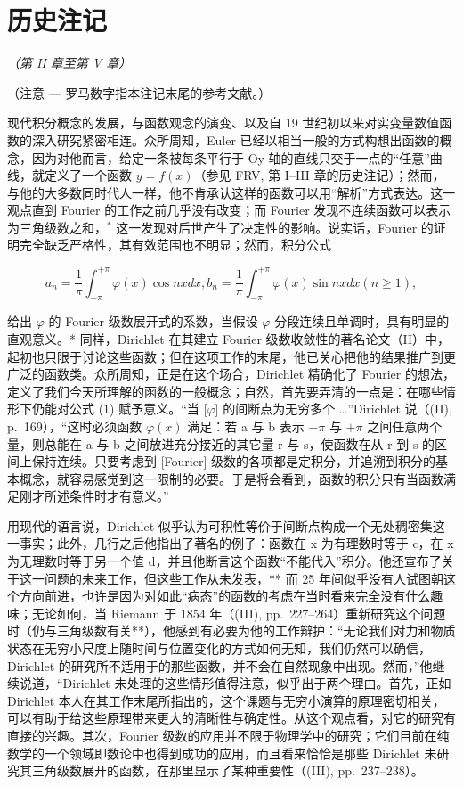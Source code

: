 \chapter*{历史注记}
{}

\begin{center}
\textit{（第 II 章至第 V 章）}
\end{center}

（注意 --- 罗马数字指本注记末尾的参考文献。）

现代积分概念的发展，与函数观念的演变、以及自 19 世纪初以来对实变量数值函数的深入研究紧密相连。众所周知，Euler 已经以相当一般的方式构想出函数的概念，因为对他而言，给定一条被每条平行于 Oy 轴的直线只交于一点的“任意”曲线，就定义了一个函数 \(y = f(x)\)（参见 FRV, 第 I--III 章的历史注记）；然而，与他的大多数同时代人一样，他不肯承认这样的函数可以用“解析”方式表达。这一观点直到 Fourier 的工作之前几乎没有改变；而 Fourier 发现不连续函数可以表示为三角级数之和，\(^{*}\) 这一发现对后世产生了决定性的影响。说实话，Fourier 的证明完全缺乏严格性，其有效范围也不明显；然而，积分公式

\[
a _ {n} = \frac {1}{\pi} \int_ {- \pi} ^ {+ \pi} \varphi (x) \cos n x d x, b _ {n} = \frac {1}{\pi} \int_ {- \pi} ^ {+ \pi} \varphi (x) \sin n x d x (n \geqslant 1),\tag{1}
\]

给出 \(\varphi\) 的 Fourier 级数展开式的系数，当假设 \(\varphi\) 分段连续且单调时，具有明显的直观意义。* 同样，Dirichlet 在其建立 Fourier 级数收敛性的著名论文（II）中，起初也只限于讨论这些函数；但在这项工作的末尾，他已关心把他的结果推广到更广泛的函数类。众所周知，正是在这个场合，Dirichlet 精确化了 Fourier 的想法，定义了我们今天所理解的函数的一般概念；自然，首先要弄清的一点是：在哪些情形下仍能对公式 (1) 赋予意义。“当 {[}\(\varphi\){]} 的间断点为无穷多个 \ldots”Dirichlet 说（(II), p.~169），“这时必须函数 \(\varphi(x)\) 满足：若 a 与 b 表示 \(-\pi\) 与 \(+\pi\) 之间任意两个量，则总能在 a 与 b 之间放进充分接近的其它量 r 与 s，使函数在从 r 到 s 的区间上保持连续。只要考虑到 {[}Fourier{]} 级数的各项都是定积分，并追溯到积分的基本概念，就容易感觉到这一限制的必要。于是将会看到，函数的积分只有当函数满足刚才所述条件时才有意义。”

用现代的语言说，Dirichlet 似乎认为可积性等价于间断点构成一个无处稠密集这一事实；此外，几行之后他指出了著名的例子：函数在 x 为有理数时等于 c，在 x 为无理数时等于另一个值 d，并且他断言这个函数“不能代入”积分。他还宣布了关于这一问题的未来工作，但这些工作从未发表，** 而 25 年间似乎没有人试图朝这个方向前进，也许是因为对如此“病态”的函数的考虑在当时看来完全没有什么趣味；无论如何，当 Riemann 于 1854 年（(III), pp.~227--264）重新研究这个问题时（仍与三角级数有关**），他感到有必要为他的工作辩护：“无论我们对力和物质状态在无穷小尺度上随时间与位置变化的方式如何无知，我们仍然可以确信，Dirichlet 的研究所不适用于的那些函数，并不会在自然现象中出现。然而，”他继续说道，“Dirichlet 未处理的这些情形值得注意，似乎出于两个理由。首先，正如 Dirichlet 本人在其工作末尾所指出的，这个课题与无穷小演算的原理密切相关，可以有助于给这些原理带来更大的清晰性与确定性。从这个观点看，对它的研究有直接的兴趣。其次，Fourier 级数的应用并不限于物理学中的研究；它们目前在纯数学的一个领域即数论中也得到成功的应用，而且看来恰恰是那些 Dirichlet 未研究其三角级数展开的函数，在那里显示了某种重要性（(III), pp.~237--238）。

